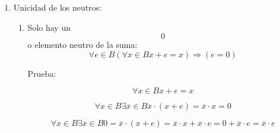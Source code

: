 \begin{enumerate}
\begin{enumerate}
\begin{enumerate}
\begin{enumerate}
        \[{\lbrack\mathit{H2}\rbrack}\phantom{\exists{z \in B}}{{x + \overline{z}} = {y + \overline{z}}}\]

        \[{\left( {x + z} \right) \cdot \left( {x + \overline{z}} \right)} = {\left( {y + z} \right) \cdot \left( {y + \overline{z}} \right)}\]

        \[{x + \left( {z \cdot \overline{z}} \right)} = {y + \left( {z \cdot \overline{z}} \right)}\]

        \[{x + 0} = {y + 0}\]

        \[x = y\]
      \item
        Para el
        producto:\[\forall x,{y \in B}\left\lbrack {\exists{z \in B}\left\lbrack {\left( {{x \cdot z} = {y \cdot z}} \right) \land \left( {{x \cdot \overline{z}} = {y \cdot \overline{z}}} \right)} \right\rbrack} \right\rbrack\Rightarrow{x = y}\]

        Prueba:

        \[{\lbrack\mathit{H1}\rbrack}\exists{z \in B}{{x \cdot z} = {y \cdot z}}\]

        \[{\lbrack\mathit{H2}\rbrack}\phantom{\exists{z \in B}}{{x \cdot \overline{z}} = {y \cdot \overline{z}}}\]

        \[{\left( {x \cdot z} \right) + \left( {x \cdot \overline{z}} \right)} = {\left( {y \cdot z} \right) + \left( {y \cdot \overline{z}} \right)}\]

        \[{x \cdot \left( {z + \overline{z}} \right)} = {y \cdot \left( {z + \overline{z}} \right)}\]

        \[{x \cdot 1} = {y \cdot 1}\]

        \[x = y\]
      \end{enumerate}
    \item
      Unicidad de los neutros:

      \begin{enumerate}
      \def\labelenumiv{\arabic{enumiv}.}
      \item
        Solo hay un \[0\]o elemento neutro de la
        suma:\[\forall{e \in B}{{({\forall{x \in B}{{x + e} = x}})}\Rightarrow{({e = 0})}}\]

        Prueba:

        \[\forall{x \in B}{x + e}{=}x\]

        \[\forall{x \in B}\exists{\overline{x} \in B}{{{\overline{x} \cdot {({x + e})}} = {\overline{x} \cdot x}} = 0}\]

        \[\forall{x \in B}\exists{\overline{x} \in B}{{{{0 = {\overline{x} \cdot {({x + e})}}} = {{\overline{x} \cdot x} + {\overline{x} \cdot e}}} = {0 + {\overline{x} \cdot e}}} = {\overline{x} \cdot e}}\]


\end{enumerate}
\end{enumerate}
\end{enumerate}
\end{enumerate}
